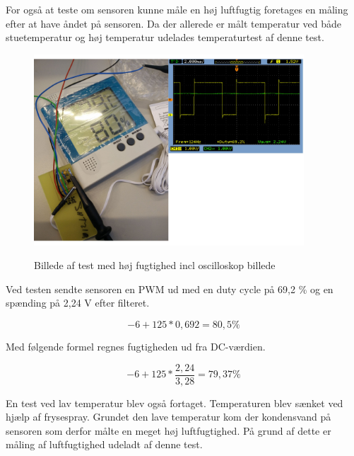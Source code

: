 For også at teste om sensoren kunne måle en høj luftfugtig foretages en måling efter at have åndet på sensoren. Da der allerede er målt temperatur ved både stuetemperatur og høj temperatur udelades temperaturtest af denne test. 

\begin{figure}[h]
\centering
{\includegraphics[width=0.90\textwidth]{filer/modultest/Billeder/test_fugtig}}
\caption{Billede af test med høj fugtighed incl oscilloskop billede}
\label{lab:test_fugtig}
\end{figure}

Ved testen sendte sensoren en PWM ud med en duty cycle på 69,2 \% og en spænding på 2,24 V efter filteret.


\begin{equation}
-6+125*0,692= 80,5\%
\end{equation}

Med følgende formel regnes fugtigheden ud fra DC-værdien.

\begin{equation}
-6+125*\frac{2,24}{3,28}= 79,37\%
\end{equation}


En test ved lav temperatur blev også fortaget. Temperaturen blev sænket ved hjælp af frysespray. Grundet den lave temperatur kom der kondensvand på sensoren som derfor målte en meget høj luftfugtighed. På grund af dette er måling af luftfugtighed udeladt af denne test. 


